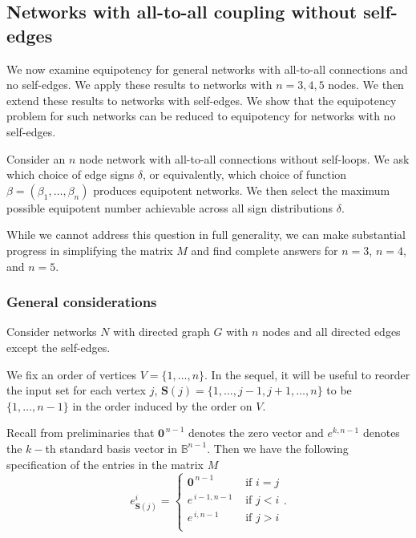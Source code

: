 \documentclass[12pt]{amsart}
\newcommand{\Sources}{\mathbf{S}}
\theoremstyle{definition}
\begin{document}
\subsection{Networks with all-to-all coupling without self-edges}
We now examine equipotency for general networks with all-to-all connections and no self-edges. We apply these results to networks with $n=3,4,5$ nodes. We then extend these results to networks with self-edges. We show that the equipotency problem for such networks can be reduced to equipotency for networks with no self-edges.

Consider an $n$ node network with all-to-all connections without self-loops. We ask which choice of edge signs $\delta$, or equivalently, which choice of function $\beta=(\beta_1, \ldots, \beta_n)$ produces equipotent networks. We then select the maximum possible equipotent number achievable across all sign distributions $\delta$.

While we cannot address this question in full generality, we can make substantial progress in simplifying the matrix $M$ and find complete answers for $n=3$, $n=4$, and $n=5$.

\subsubsection{General considerations}
Consider networks $N$ with directed graph $G$ with $n$ nodes and all directed edges except the self-edges. 

We fix an order of vertices $V=\{1,\ldots,n\}$. In the sequel, it will be useful to reorder the input set for each vertex $j$, $\Sources(j)=\{1, \ldots, j-1, j+1, \ldots, n\}$ to be $\{1, \ldots, n-1\}$ in the order induced by the order on $V$.

Recall from preliminaries that $\mathbf{0}^{\,n-1}$ denotes the zero vector and $e^{k,n-1}$ denotes the $k-$th standard basis vector in $\mathbb{B}^{n-1}$. 
Then we have the following specification of the entries in the matrix $M$
\begin{equation} \label{gen:input}
e^i_{\Sources(j)}=\left \{
\begin{array}{ccc}
\boldsymbol{0}^{\,n-1} & \mbox{ if } i=j\\
e^{\,i-1,n-1} & \mbox{ if } j<i \\
e^{\,i,n-1} & \mbox{ if } j>i \\
\end{array}
\right. .
\end{equation}
\end{document}
